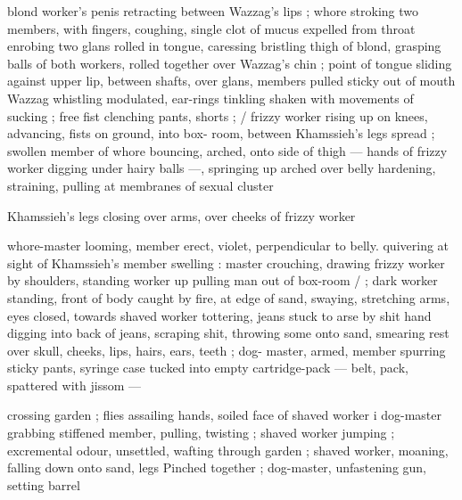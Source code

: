 blond worker's penis retracting between Wazzag's lips ; whore
stroking two members, with fingers, coughing, single clot of mucus
expelled from throat enrobing two glans rolled in tongue, caressing
bristling thigh of blond, grasping balls of both workers, rolled
together over Wazzag’s chin ; point of tongue sliding against upper
lip, between shafts, over glans, members pulled sticky out of mouth
Wazzag whistling modulated, ear-rings tinkling shaken with
movements of sucking ; free fist clenching pants, shorts ; / frizzy
worker rising up on knees, advancing, fists on ground, into box-
room, between Khamssieh's legs spread ; swollen member of whore
bouncing, arched, onto side of thigh — hands of frizzy worker
digging under hairy balls —, springing up arched over belly
hardening, straining, pulling at membranes of sexual cluster

Khamssieh's legs closing over arms, over cheeks of frizzy worker

whore-master looming, member erect, violet, perpendicular to belly.
quivering at sight of Khamssieh's member swelling : master
crouching, drawing frizzy worker by shoulders, standing worker up
pulling man out of box-room / ; dark worker standing, front of body
caught by fire, at edge of sand, swaying, stretching arms, eyes
closed, towards shaved worker tottering, jeans stuck to arse by shit
hand digging into back of jeans, scraping shit, throwing some onto
sand, smearing rest over skull, cheeks, lips, hairs, ears, teeth ; dog-
master, armed, member spurring sticky pants, syringe case tucked
into empty cartridge-pack — belt, pack, spattered with jissom —

crossing garden ; flies assailing hands, soiled face of shaved worker
i dog-master grabbing stiffened member, pulling, twisting ; shaved
worker jumping ; excremental odour, unsettled, wafting through
garden ; shaved worker, moaning, falling down onto sand, legs
Pinched together ; dog-master, unfastening gun, setting barrel

